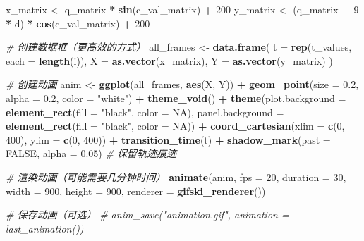 \documentclass[
  twoside]{book}
\newenvironment{Shaded}{\begin{snugshade}}{\end{snugshade}}
\newcommand{\AttributeTok}[1]{\textcolor[rgb]{0.13,0.29,0.53}{#1}}
\newcommand{\CommentTok}[1]{\textcolor[rgb]{0.56,0.35,0.01}{\textit{#1}}}
\newcommand{\ConstantTok}[1]{\textcolor[rgb]{0.56,0.35,0.01}{#1}}
\newcommand{\DecValTok}[1]{\textcolor[rgb]{0.00,0.00,0.81}{#1}}
\newcommand{\FloatTok}[1]{\textcolor[rgb]{0.00,0.00,0.81}{#1}}
\newcommand{\FunctionTok}[1]{\textcolor[rgb]{0.13,0.29,0.53}{\textbf{#1}}}
\newcommand{\NormalTok}[1]{#1}
\newcommand{\OtherTok}[1]{\textcolor[rgb]{0.56,0.35,0.01}{#1}}
\newcommand{\SpecialCharTok}[1]{\textcolor[rgb]{0.81,0.36,0.00}{\textbf{#1}}}
\newcommand{\StringTok}[1]{\textcolor[rgb]{0.31,0.60,0.02}{#1}}
\begin{document}
\begin{Shaded}
\begin{Highlighting}[]
\NormalTok{x\_matrix }\OtherTok{\textless{}{-}}\NormalTok{ q\_matrix }\SpecialCharTok{*} \FunctionTok{sin}\NormalTok{(c\_val\_matrix) }\SpecialCharTok{+} \DecValTok{200}
\NormalTok{y\_matrix }\OtherTok{\textless{}{-}}\NormalTok{ (q\_matrix }\SpecialCharTok{+} \DecValTok{9} \SpecialCharTok{*}\NormalTok{ d) }\SpecialCharTok{*} \FunctionTok{cos}\NormalTok{(c\_val\_matrix) }\SpecialCharTok{+} \DecValTok{200}

\CommentTok{\# 创建数据框（更高效的方式）}
\NormalTok{all\_frames }\OtherTok{\textless{}{-}} \FunctionTok{data.frame}\NormalTok{(}
  \AttributeTok{t =} \FunctionTok{rep}\NormalTok{(t\_values, }\AttributeTok{each =} \FunctionTok{length}\NormalTok{(i)),}
  \AttributeTok{X =} \FunctionTok{as.vector}\NormalTok{(x\_matrix),}
  \AttributeTok{Y =} \FunctionTok{as.vector}\NormalTok{(y\_matrix)}
\NormalTok{)}

\CommentTok{\# 创建动画}
\NormalTok{anim }\OtherTok{\textless{}{-}} \FunctionTok{ggplot}\NormalTok{(all\_frames, }\FunctionTok{aes}\NormalTok{(X, Y)) }\SpecialCharTok{+}
  \FunctionTok{geom\_point}\NormalTok{(}\AttributeTok{size =} \FloatTok{0.2}\NormalTok{, }\AttributeTok{alpha =} \FloatTok{0.2}\NormalTok{, }\AttributeTok{color =} \StringTok{"white"}\NormalTok{) }\SpecialCharTok{+}
  \FunctionTok{theme\_void}\NormalTok{() }\SpecialCharTok{+}
  \FunctionTok{theme}\NormalTok{(}\AttributeTok{plot.background =} \FunctionTok{element\_rect}\NormalTok{(}\AttributeTok{fill =} \StringTok{"black"}\NormalTok{, }\AttributeTok{color =} \ConstantTok{NA}\NormalTok{),}
        \AttributeTok{panel.background =} \FunctionTok{element\_rect}\NormalTok{(}\AttributeTok{fill =} \StringTok{"black"}\NormalTok{, }\AttributeTok{color =} \ConstantTok{NA}\NormalTok{)) }\SpecialCharTok{+}
  \FunctionTok{coord\_cartesian}\NormalTok{(}\AttributeTok{xlim =} \FunctionTok{c}\NormalTok{(}\DecValTok{0}\NormalTok{, }\DecValTok{400}\NormalTok{), }\AttributeTok{ylim =} \FunctionTok{c}\NormalTok{(}\DecValTok{0}\NormalTok{, }\DecValTok{400}\NormalTok{)) }\SpecialCharTok{+}
  \FunctionTok{transition\_time}\NormalTok{(t) }\SpecialCharTok{+}
  \FunctionTok{shadow\_mark}\NormalTok{(}\AttributeTok{past =} \ConstantTok{FALSE}\NormalTok{, }\AttributeTok{alpha =} \FloatTok{0.05}\NormalTok{)  }\CommentTok{\# 保留轨迹痕迹}

\CommentTok{\# 渲染动画（可能需要几分钟时间）}
\FunctionTok{animate}\NormalTok{(anim, }
        \AttributeTok{fps =} \DecValTok{20}\NormalTok{, }
        \AttributeTok{duration =} \DecValTok{30}\NormalTok{, }
        \AttributeTok{width =} \DecValTok{900}\NormalTok{, }
        \AttributeTok{height =} \DecValTok{900}\NormalTok{,}
        \AttributeTok{renderer =} \FunctionTok{gifski\_renderer}\NormalTok{())}

\CommentTok{\# 保存动画（可选）}
\CommentTok{\# anim\_save("animation.gif", animation = last\_animation())}
\end{Highlighting}
\end{Shaded}
\end{document}
